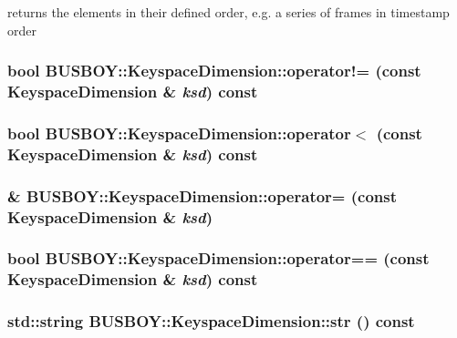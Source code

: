 returns the elements in their defined order, e.g. a series of frames in timestamp order \hypertarget{classBUSBOY_1_1KeyspaceDimension_a22b8802999a801a96b9da7968753c636}{
\subsubsection[{operator!=}]{\setlength{\rightskip}{0pt plus 5cm}bool BUSBOY::KeyspaceDimension::operator!= (const {\bf KeyspaceDimension} \& {\em ksd}) const}}
\label{classBUSBOY_1_1KeyspaceDimension_a22b8802999a801a96b9da7968753c636}
\hypertarget{classBUSBOY_1_1KeyspaceDimension_aa1e0960c0f20c7eeeac9a458e2675281}{
\subsubsection[{operator$<$}]{\setlength{\rightskip}{0pt plus 5cm}bool BUSBOY::KeyspaceDimension::operator$<$ (const {\bf KeyspaceDimension} \& {\em ksd}) const}}
\label{classBUSBOY_1_1KeyspaceDimension_aa1e0960c0f20c7eeeac9a458e2675281}
\hypertarget{classBUSBOY_1_1KeyspaceDimension_aac917a01e31957456ef0e90f924bfdf5}{
\subsubsection[{operator=}]{ \& BUSBOY::KeyspaceDimension::operator= (const {\bf KeyspaceDimension} \& {\em ksd})}}
\label{classBUSBOY_1_1KeyspaceDimension_aac917a01e31957456ef0e90f924bfdf5}
\hypertarget{classBUSBOY_1_1KeyspaceDimension_a5527508b97f03a40e09ce3fd871942db}{
\subsubsection[{operator==}]{\setlength{\rightskip}{0pt plus 5cm}bool BUSBOY::KeyspaceDimension::operator== (const {\bf KeyspaceDimension} \& {\em ksd}) const}}
\label{classBUSBOY_1_1KeyspaceDimension_a5527508b97f03a40e09ce3fd871942db}
\hypertarget{classBUSBOY_1_1KeyspaceDimension_afb55c8f67a2a21953231462d788e2e60}{
\subsubsection[{str}]{\setlength{\rightskip}{0pt plus 5cm}std::string BUSBOY::KeyspaceDimension::str () const}}
\label{classBUSBOY_1_1KeyspaceDimension_afb55c8f67a2a21953231462d788e2e60}


